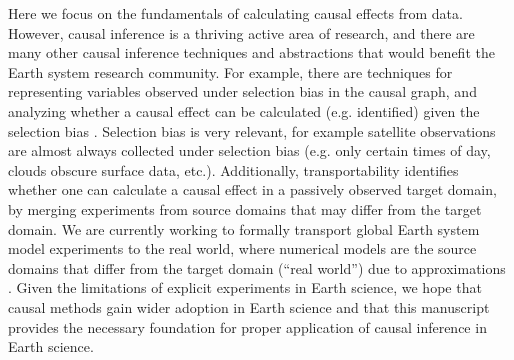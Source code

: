 \documentclass[12pt]{article}
\begin{document}
Here we focus on the fundamentals of calculating causal effects from
data. However, causal inference is a thriving active area of
research, and there are many other causal inference techniques and
abstractions that would benefit the Earth system research
community. For example, there are techniques for representing
variables observed under selection bias in the causal graph, and
analyzing whether a causal effect can be calculated (e.g. identified)
given the selection bias
\citep[e.g.,][]{bareinboim2014recovering}. Selection bias is very
relevant, for example satellite observations are almost always
collected under selection bias (e.g. only certain times of day, clouds
obscure surface data, etc.). Additionally, transportability
\citep[e.g.,][]{bareinboim2012transportability} identifies whether one
can calculate a causal effect in a passively observed target domain,
by merging experiments from source domains that may differ from the
target domain. We are currently working to formally transport global
Earth system model experiments to the real world, where numerical
models are the source domains that differ from the target domain
(``real world'') due to approximations \citep[][in
prep]{massmann}. Given the limitations of explicit experiments in
Earth science, we hope that causal methods gain wider adoption in
Earth science and that this manuscript provides the necessary
foundation for proper application of causal inference in Earth
science.


\end{document}

